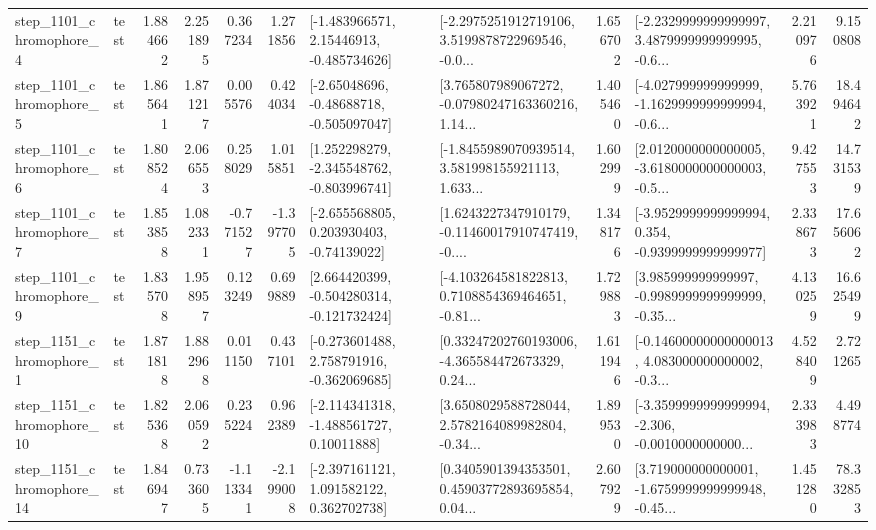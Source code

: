 \begin{tabular}{llrrrrllrlrr}
  step\_1101\_chromophore\_4 &      test &      1.884662 &    2.251895 &      0.367234 &  1.271856 &    [-1.483966571, 2.15446913, -0.485734626] &  [-2.2975251912719106, 3.5199878722969546, -0.0... &       1.656702 &  [-2.2329999999999997, 3.4879999999999995, -0.6... &            2.210976 &          9.150808 \\
  step\_1101\_chromophore\_5 &      test &      1.865641 &    1.871217 &      0.005576 &  0.424034 &    [-2.65048696, -0.48688718, -0.505097047] &  [3.765807989067272, -0.07980247163360216, 1.14... &       1.405460 &  [-4.027999999999999, -1.1629999999999994, -0.6... &            5.763921 &         18.494642 \\
  step\_1101\_chromophore\_6 &      test &      1.808524 &    2.066553 &      0.258029 &  1.015851 &   [1.252298279, -2.345548762, -0.803996741] &  [-1.8455989070939514, 3.581998155921113, 1.633... &       1.602999 &  [2.0120000000000005, -3.6180000000000003, -0.5... &            9.427553 &         14.731539 \\
  step\_1101\_chromophore\_7 &      test &      1.853858 &    1.082331 &     -0.771527 & -1.397705 &    [-2.655568805, 0.203930403, -0.74139022] &  [1.6243227347910179, -0.11460017910747419, -0.... &       1.348176 &  [-3.9529999999999994, 0.354, -0.9399999999999977] &            2.338673 &         17.656062 \\
  step\_1101\_chromophore\_9 &      test &      1.835708 &    1.958957 &      0.123249 &  0.699889 &   [2.664420399, -0.504280314, -0.121732424] &  [-4.103264581822813, 0.7108854369464651, -0.81... &       1.729883 &  [3.985999999999997, -0.9989999999999999, -0.35... &            4.130259 &         16.625499 \\
  step\_1151\_chromophore\_1 &      test &      1.871818 &    1.882968 &      0.011150 &  0.437101 &   [-0.273601488, 2.758791916, -0.362069685] &  [0.33247202760193006, -4.365584472673329, 0.24... &       1.611946 &  [-0.14600000000000013, 4.083000000000002, -0.3... &            4.528409 &          2.721265 \\
 step\_1151\_chromophore\_10 &      test &      1.825368 &    2.060592 &      0.235224 &  0.962389 &    [-2.114341318, -1.488561727, 0.10011888] &  [3.6508029588728044, 2.5782164089982804, -0.34... &       1.899530 &  [-3.3599999999999994, -2.306, -0.0010000000000... &            2.333983 &          4.498774 \\
 step\_1151\_chromophore\_14 &      test &      1.846947 &    0.733605 &     -1.113341 & -2.199008 &    [-2.397161121, 1.091582122, 0.362702738] &  [0.3405901394353501, 0.45903772893695854, 0.04... &       2.607929 &  [3.719000000000001, -1.6759999999999948, -0.45... &            1.451280 &         78.332853 \\

\end{tabular}
